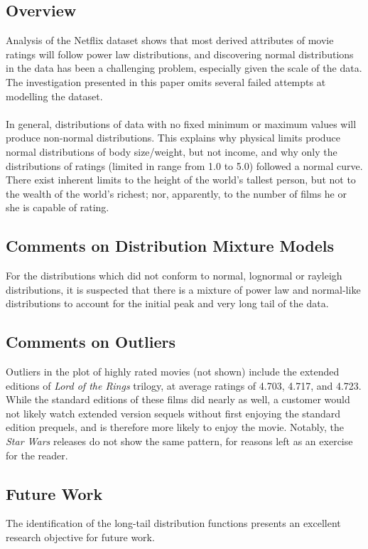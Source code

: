 \documentclass[prodmode,acmtecs]{acmsmall}
\begin{document}
\subsection{Overview}
Analysis of the Netflix dataset shows that most derived attributes of movie ratings will follow power law distributions, and discovering normal distributions in the data has been a challenging problem, especially given the scale of the data. The investigation presented in this paper omits several failed attempts at modelling the dataset. 
\\
\\
In general, distributions of data with no fixed minimum or maximum values will produce non-normal distributions. This explains why physical limits produce normal distributions of body size/weight, but not income, and why only the distributions of ratings (limited in range from 1.0 to 5.0) followed a normal curve. There exist inherent limits to the height of the world's tallest person, but not to the wealth of the world's richest; nor, apparently, to the number of films he or she is capable of rating.

\subsection{Comments on Distribution Mixture Models}
For the distributions which did not conform to normal, lognormal or rayleigh distributions, it is suspected that there is a mixture of power law and normal-like distributions to account for the initial peak and very long tail of the data.

\subsection{Comments on Outliers}
Outliers in the plot of highly rated movies (not shown) include the extended editions of \textit{Lord of the Rings} trilogy, at average ratings of 4.703, 4.717, and 4.723. While the standard editions of these films did nearly as well, a customer would not likely watch extended version sequels without first enjoying the standard edition prequels, and is therefore more likely to enjoy the movie. Notably, the \textit{Star Wars} releases do not show the same pattern, for reasons left as an exercise for the reader.

\subsection{Future Work}
The identification of the long-tail distribution functions presents an excellent research objective for future work.
\end{document}
